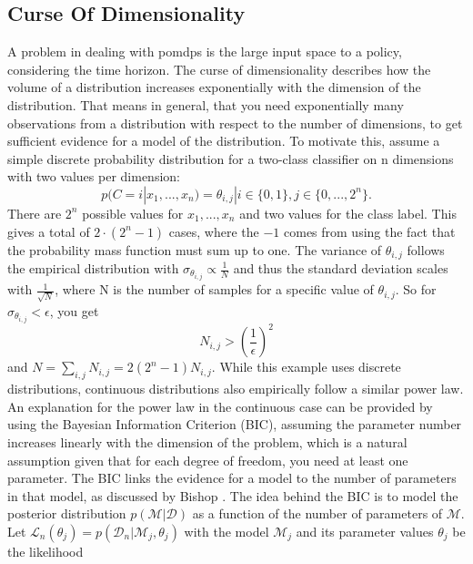 \subsection{Curse Of Dimensionality}
\label{COD}
A problem in dealing with \ac{pomdp}s is the large input space to a policy, considering the time horizon. 
The curse of dimensionality describes how the volume of a distribution increases exponentially with the dimension of the distribution. That means in general, 
that you need exponentially many observations from a distribution with respect to the number of dimensions, to get sufficient evidence for a model of the distribution. 
To motivate this, assume a simple 
discrete probability distribution for a two-class classifier on n dimensions with two values per dimension:
\begin{equation}
    p(C=i|x_1, ..., x_n)  = \theta_{i,j} | i \in \{0, 1\}, j \in \{0, ..., 2^n\}.
\end{equation}
There are $2^n$ possible values for $x_1, ..., x_n$ and two values for the class label. This gives a total of $2 \cdot (2^n-1)$ cases, where the $-1$ comes from using 
the fact that the probability mass function must sum up to one. The variance of $\theta_{i, j}$ follows the empirical distribution 
with $\sigma_{\theta_{i,j}} \propto \frac{1}{N}$ and thus the standard deviation scales with $\frac{1}{\sqrt{N}}$, where N is the number of samples 
for a specific value of $\theta_{i,j}$. So for $\sigma_{\theta_{i,j}} < \epsilon$, you get
\begin{equation}
    N_{i,j} > \left(\frac{1}{\epsilon}\right)^2
\end{equation}
and $N = \sum_{i, j} N_{i, j} = 2 (2^n-1) N_{i,j}$. While this example uses discrete distributions, continuous distributions also empirically follow a similar 
power law.\\
An explanation for the power law in the continuous case can be provided by using the Bayesian Information Criterion (BIC), assuming the parameter number increases linearly with the dimension 
of the problem, which is a natural assumption given that for each degree of freedom, you need at least one parameter. 
The BIC links the evidence for a model to the number of parameters in that model, as discussed by Bishop \cite[chapter 4.4.1]{bishop}.
The idea behind the BIC is to model the posterior distribution $p(\mathcal{M}|\mathcal{D})$ as a function of the number of parameters of $\mathcal{M}$. 
Let $\mathcal{L}_n(\theta_j) = p(\mathcal{D}_n|\mathcal{M}_j, \theta_{j})$ with the model $\mathcal{M}_j$ and its parameter values $\theta_j$ be the likelihood 
